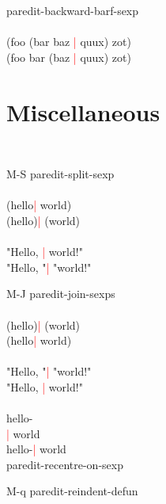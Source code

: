 \documentclass[8pt,a4paper,landscape]{extarticle}
\newcommand{\csr}{\textcolor{red}{| }}
\begin{document}
\begin{multicols}{4}
\begin{eqlist}
\longitem[C-M-$\rightarrow$] paredit-backward-barf-sexp\\
  \\
  (foo (bar baz \csr quux) zot)\\
  (foo bar (baz \csr quux) zot)\\
\end{eqlist}

\section{Miscellaneous}
\begin{eqlist}
  \tt
\item[M-S] paredit-split-sexp\\
  \\
  (hello\csr  world)\\
  (hello)\csr  (world)\\
  \\
  "Hello, \csr world!"\\
  "Hello, "\csr  "world!"\\


\item[M-J] paredit-join-sexps\\
  \\
  (hello)\csr  (world)\\
  (hello\csr  world)\\
  \\
  "Hello, "\csr  "world!"\\
  "Hello, \csr world!"\\
  \\
  hello-\\
  \csr   world\\
  hello-\csr world\\

\longitem[C-c C-M-l] paredit-recentre-on-sexp

\item[M-q] paredit-reindent-defun

\end{eqlist}

\end{multicols}
\end{document}
